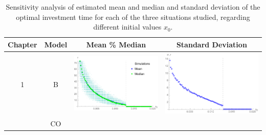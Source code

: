 \begin{table}[!htb]
	\caption{Sensitivity analysis of estimated mean and median and standard deviation of the optimal investment time for each of the three situations studied, regarding different initial values $x_0$. }
	\begin{tabular}{c|c|c|c}
		\hline
		Chapter & Model & Mean \% Median & Standard Deviation \\ \hline
		1 & B & 
		\begin{minipage}{.4\textwidth}
			\includegraphics[width=\linewidth]{StopTime/1_BMtau.pdf}
		\end{minipage}
		& \begin{minipage}{.4\textwidth}
			\includegraphics[width=\linewidth]{StopTime/1_BMsd.pdf}
		\end{minipage} 
	\\ \cline{2-4} 
		& CO & 
		\begin{minipage}{.4\textwidth}

\end{minipage}
\end{tabular}
\end{table}
